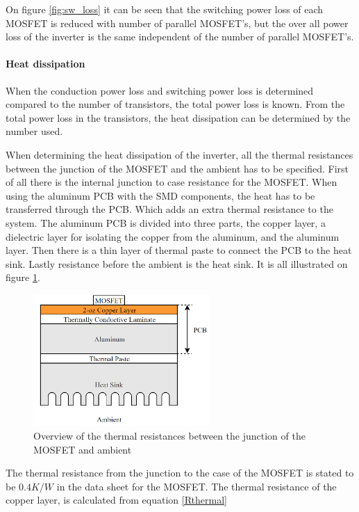 On figure \ref{fig:sw_loss} it can be seen that the switching power loss of each MOSFET is reduced with number of parallel MOSFET's, but the over all power loss of the inverter is the same independent of the number of parallel MOSFET's.

\paragraph{Heat dissipation}
When the conduction power loss and switching power loss is determined compared to the number of transistors, the total power loss is known. From the total power loss in the transistors, the heat dissipation can be determined by the number used.

When determining the heat dissipation of the inverter, all the thermal resistances between the junction of the MOSFET and the ambient has to be specified.
First of all there is the internal junction to case resistance for the MOSFET.
When using the aluminum PCB with the SMD components, the heat has to be transferred through the PCB. Which adds an extra thermal resistance to the system. The aluminum PCB is divided into three parts, the copper layer, a dielectric layer for isolating the copper from the aluminum, and the aluminum layer.
Then there is a thin layer of thermal paste to connect the PCB to the heat sink. Lastly resistance before the ambient is the heat sink. It is all illustrated on figure \ref{fig:thermal_overview}.

    \begin{figure}[H]
		\centering
		\includegraphics[width=0.6\textwidth]{pictures/hardware/Power_Board/Thermal_overview.png}
		\caption{Overview of the thermal resistances between the junction of the MOSFET and ambient}
		\label{fig:thermal_overview}
	\end{figure}
	
The thermal resistance from the junction to the case of the MOSFET is stated to be $0.4 K/W$ in the data sheet for the MOSFET.\cite{mosfet}
The thermal resistance of the copper layer, is calculated from equation \ref{Rthermal}


